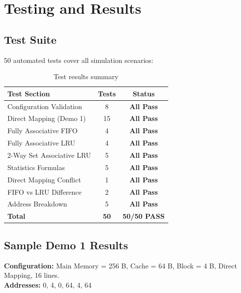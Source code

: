 \documentclass[12pt,a4paper]{report}
\begin{document}
\chapter{Testing and Results}

\section{Test Suite}
50 automated tests cover all simulation scenarios:

\begin{table}[H]
\centering
\begin{tabular}{lcc}
\toprule
\textbf{Test Section} & \textbf{Tests} & \textbf{Status} \\
\midrule
Configuration Validation   & 8  & \textcolor{hitgreen}{\textbf{All Pass}} \\
Direct Mapping (Demo 1)    & 15 & \textcolor{hitgreen}{\textbf{All Pass}} \\
Fully Associative FIFO     & 4  & \textcolor{hitgreen}{\textbf{All Pass}} \\
Fully Associative LRU      & 4  & \textcolor{hitgreen}{\textbf{All Pass}} \\
2-Way Set Associative LRU  & 5  & \textcolor{hitgreen}{\textbf{All Pass}} \\
Statistics Formulas        & 5  & \textcolor{hitgreen}{\textbf{All Pass}} \\
Direct Mapping Conflict    & 1  & \textcolor{hitgreen}{\textbf{All Pass}} \\
FIFO vs LRU Difference     & 2  & \textcolor{hitgreen}{\textbf{All Pass}} \\
Address Breakdown          & 5  & \textcolor{hitgreen}{\textbf{All Pass}} \\
\midrule
\textbf{Total}             & \textbf{50} & \textcolor{hitgreen}{\textbf{50/50 PASS}} \\
\bottomrule
\end{tabular}
\caption{Test results summary}
\end{table}

\section{Sample Demo 1 Results}
\textbf{Configuration:} Main Memory = 256 B, Cache = 64 B, Block = 4 B, Direct Mapping, 16 lines.\\
\textbf{Addresses:} 0, 4, 0, 64, 4, 64
\end{document}
